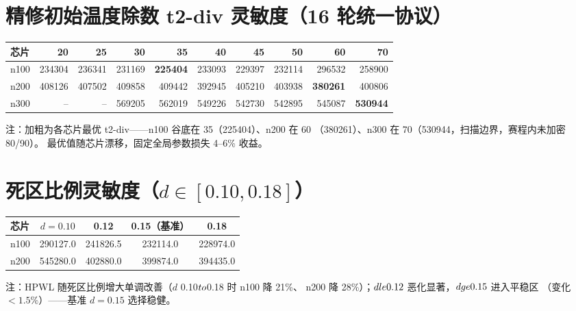 \documentclass[12pt,a4paper]{article}
\begin{document}
\section{精修初始温度除数 t2-div 灵敏度（16 轮统一协议）}

\begin{table}[H]
\centering
\scriptsize
\setlength{\tabcolsep}{1.8pt}
\begin{tabular}{lrrrrrrrrr}
\toprule
芯片 & 20 & 25 & 30 & 35 & 40 & 45 & 50 & 60 & 70 \\
\midrule

n100 & 234304 & 236341 & 231169 & \textbf{225404} & 233093 & 229397 & 232114 & 296532 & 258900 \\
n200 & 408126 & 407502 & 409858 & 409442 & 392945 & 405210 & 403938 & \textbf{380261} & 400806 \\
n300 & -- & -- & 569205 & 562019 & 549226 & 542730 & 542895 & 545087 & \textbf{530944} \\
\bottomrule
\end{tabular}
\end{table}

注：加粗为各芯片最优 t2-div——n100 谷底在 35（225404）、n200 在 60
（380261）、n300 在 70（530944，扫描边界，赛程内未加密 80/90）。
最优值随芯片漂移，固定全局参数损失 4--6\% 收益。

\section{死区比例灵敏度（$d\in[0.10,0.18]$）}

\begin{table}[H]
\centering
\scriptsize
\setlength{\tabcolsep}{3pt}
\begin{tabular}{lcccc}
\toprule
芯片 & $d=0.10$ & 0.12 & 0.15（基准） & 0.18 \\
\midrule

n100 & 290127.0 & 241826.5 & 232114.0 & 228974.0 \\
n200 & 545280.0 & 402880.0 & 399874.0 & 394435.0 \\
\bottomrule
\end{tabular}
\end{table}

注：HPWL 随死区比例增大单调改善（$d$ 0.10$\\to$0.18 时 n100 降 21\%、
n200 降 28\%）；$d\\le0.12$ 恶化显著，$d\\ge0.15$ 进入平稳区
（变化 $<1.5\%$）——基准 $d=0.15$ 选择稳健。
\end{document}
